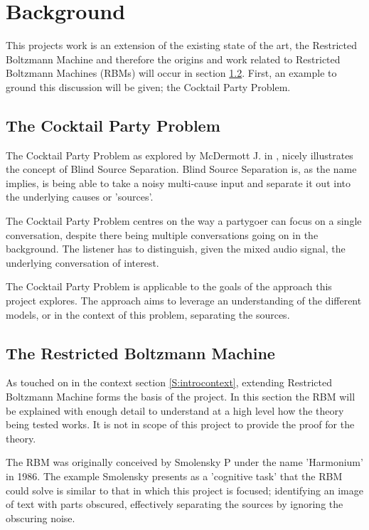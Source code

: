 
\chapter{Background}\label{C:background}

This projects work is an extension of the existing state of the art, the Restricted Boltzmann Machine and therefore the origins and work related to Restricted Boltzmann Machines (RBMs) will occur in section \ref{S:RBM}. First, an example to ground this discussion will be given; the Cocktail Party Problem.

\section{The Cocktail Party Problem}\label{SS:CPP}

The Cocktail Party Problem as explored by McDermott J. in \cite{McDermott:2009cs}, nicely illustrates the concept of Blind Source Separation. Blind Source Separation is, as the name implies, is being able to take a noisy multi-cause input and separate it out into the underlying causes or 'sources'.

The Cocktail Party Problem centres on the way a partygoer can focus on a single conversation, despite there being multiple conversations going on in the background. The listener has to distinguish, given the mixed audio signal, the underlying conversation of interest. 

The Cocktail Party Problem is applicable to the goals of the approach this project explores. The approach aims to leverage an understanding of the different models, or in the context of this problem, separating the sources. 

\section{The Restricted Boltzmann Machine}\label{S:RBM}

As touched on in the context section \ref{S:introcontext}, extending Restricted Boltzmann Machine forms the basis of the project. In this section the RBM will be explained with enough detail to understand at a high level how the theory being tested works. It is not in scope of this project to provide the proof for the theory.

The RBM  was originally  conceived by Smolensky P under the name 'Harmonium' \cite{Smolensky:1986vy}  in 1986. The example Smolensky presents as a 'cognitive task' that the RBM could solve is similar to that in which this project is focused; identifying an image of text with parts obscured, effectively separating the sources by ignoring the obscuring noise.

